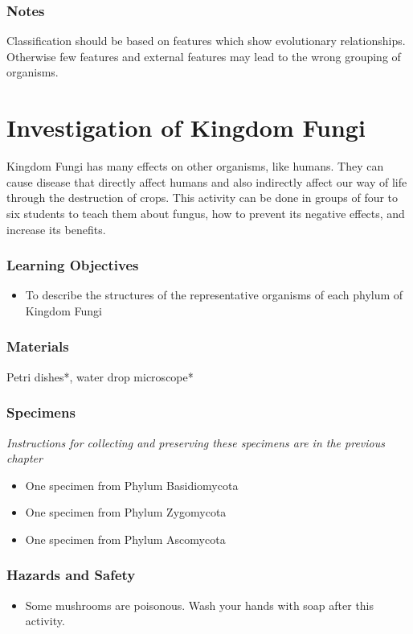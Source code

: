 \subsubsection*{Notes}
Classification should be based on features which show evolutionary relationships. Otherwise few features and external features may lead to the wrong grouping of organisms.


\section{Investigation of Kingdom Fungi}
Kingdom Fungi has many effects on other organisms, like humans.  They can cause disease that directly affect humans and also indirectly affect our way of life through the destruction of crops.  This activity can be done in groups of four to six students to teach them about fungus, how to prevent its negative effects, and increase its benefits.

\subsubsection*{Learning Objectives}
\begin{itemize}
\item{To describe the structures of the representative organisms of each phylum of Kingdom Fungi}
\end{itemize}

\subsubsection*{Materials}
Petri dishes*, water drop microscope*

\subsubsection*{Specimens}
\textit{Instructions for collecting and preserving these specimens are in the previous chapter}
\begin{itemize}
\item{One specimen from Phylum Basidiomycota}
\item{One specimen from Phylum Zygomycota}
\item{One specimen from Phylum Ascomycota}
\end{itemize}

\subsubsection*{Hazards and Safety}
\begin{itemize}
\item{Some mushrooms are poisonous. Wash your hands with soap after this activity.}
\end{itemize}

